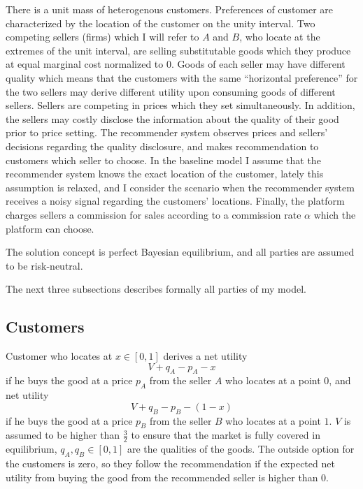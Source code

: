 \documentclass[a4paper]{article}
\begin{document}
	
	There is a unit mass of heterogenous customers. Preferences of customer are characterized by the location of the customer on the unity interval. Two competing sellers (firms) which I will refer to $A$ and $B$, who locate at the extremes of the unit interval, are selling substitutable goods which they produce at equal marginal cost normalized to 0. Goods of each seller may have different quality which means that the customers with the same ``horizontal preference'' for the two sellers may derive different utility upon consuming goods of different sellers. Sellers are competing in prices which they set simultaneously. In addition, the sellers may costly disclose the information about the quality of their good prior to price setting. The recommender system observes prices and sellers' decisions regarding the quality disclosure, and makes recommendation to customers which seller to choose. In the baseline model I assume that the recommender system knows the exact location of the customer, lately this assumption is relaxed, and I consider the scenario when the recommender system receives a noisy signal regarding the customers' locations. Finally, the platform charges sellers a commission for sales according to a commission rate $\alpha$ which the platform can choose. 
	
	
	
	The solution concept is perfect Bayesian equilibrium, and all parties are assumed to be risk-neutral.
	
	
	
	The next three subsections describes formally all parties of my model.
	
	
	
	
	
	\subsection{Customers}
	Customer who locates at $x \in [0, 1]$ derives a net utility $$V + q_A - p_A - x$$ if  he buys the good at a price $p_A$ from the seller $A$ who locates at a point $0$, and net utility $$V + q_B - p_B - (1-x)$$ if  he buys the good at a price $p_B$ from the seller $B$ who locates at a point $1$. $V$ is assumed to be higher than $\frac{3}{2}$ to ensure that the market is fully covered in equilibrium, $q_A, q_B \in [0, 1]$ are the qualities of the goods. The outside option for the customers is zero, so they follow the recommendation if the expected net utility from buying the good from the recommended seller is higher than 0.
	
\end{document}
